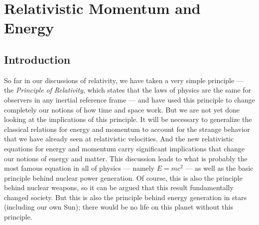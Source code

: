 \chapter{Relativistic Momentum and Energy}
\label{chapter:relativity_pande}



\section{Introduction}

So far in our discussions of relativity, we have taken a very simple
principle --- the {\em Principle of Relativity}, which states that the
laws of physics are the same for observers in any inertial reference
frame --- and have used this principle to change completely our notions
of how time and space work.  But we are not yet done looking at the
implications of this principle.  It will be necessary to generalize
the classical relations for energy and momentum to account for the
strange behavior that we have already seen at relativistic velocities.
And the new relativistic equations for energy and momentum carry
significant implications that change our notions of energy and matter.
This discussion leads to what is probably the most famous equation in
all of physics --- namely $E = mc^2$ --- as well as the basic principle
behind nuclear power generation.  Of course, this is also the principle 
behind nuclear weapons, so it can be argued that this result fundamentally
changed society.  But this is also the principle behind energy generation
in stars (including our own Sun); there would be no life on this planet
without this principle.

